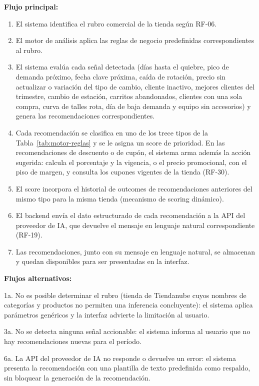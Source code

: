 \noindent\textbf{Flujo principal:}
\begin{enumerate}
    \item El sistema identifica el rubro comercial de la tienda según RF-06.
    \item El motor de análisis aplica las reglas de negocio predefinidas correspondientes al rubro.
    \item El sistema evalúa cada señal detectada (días hasta el quiebre, pico de demanda próximo, fecha clave próxima, caída de rotación, precio sin actualizar o variación del tipo de cambio, cliente inactivo, mejores clientes del trimestre, cambio de estación, carritos abandonados, clientes con una sola compra, curva de talles rota, día de baja demanda y equipo sin accesorios) y genera las recomendaciones correspondientes.
    \item Cada recomendación se clasifica en uno de los trece tipos de la Tabla~\ref{tab:motor-reglas} y se le asigna un score de prioridad. En las recomendaciones de descuento o de cupón, el sistema arma además la acción sugerida: calcula el porcentaje y la vigencia, o el precio promocional, con el piso de margen, y consulta los cupones vigentes de la tienda (RF-30).
    \item El score incorpora el historial de outcomes de recomendaciones anteriores del mismo tipo para la misma tienda (mecanismo de scoring dinámico).
    \item El backend envía el dato estructurado de cada recomendación a la API del proveedor de IA, que devuelve el mensaje en lenguaje natural correspondiente (RF-19).
    \item Las recomendaciones, junto con su mensaje en lenguaje natural, se almacenan y quedan disponibles para ser presentadas en la interfaz.
\end{enumerate}

\noindent\textbf{Flujos alternativos:}

\noindent 1a. No es posible determinar el rubro (tienda de Tiendanube cuyos nombres de categorías y productos no permiten una inferencia concluyente): el sistema aplica parámetros genéricos y la interfaz advierte la limitación al usuario.

\noindent 3a. No se detecta ninguna señal accionable: el sistema informa al usuario que no hay recomendaciones nuevas para el período.

\noindent 6a. La API del proveedor de IA no responde o devuelve un error: el sistema presenta la recomendación con una plantilla de texto predefinida como respaldo, sin bloquear la generación de la recomendación.


